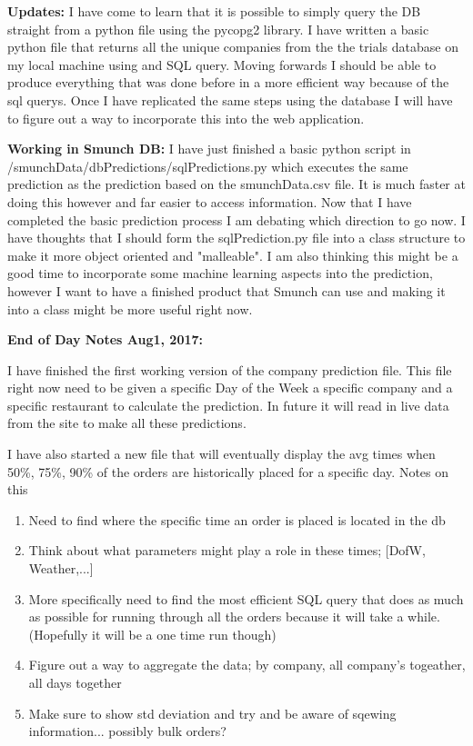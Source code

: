 \documentclass[12pt]{article}
\begin{document}
\textbf{Updates:} I have come to learn that it is possible to simply query the DB straight from a python file using the pycopg2 library. I have written a basic python file that returns all the unique companies from the the trials database on my local machine using and SQL query. Moving forwards I should be able to produce everything that was done before in a more efficient way because of the sql querys. Once I have replicated the same steps using the database I will have to figure out a way to incorporate this into the web application.

\textbf{Working in Smunch DB:} I have just finished a basic python script in /smunchData/dbPredictions/sqlPredictions.py which executes the same prediction as the prediction based on the smunchData.csv file. It is much faster at doing this however and far easier to access information. Now that I have completed the basic prediction process I am debating which direction to go now. I have thoughts that I should form the sqlPrediction.py file into a class structure to make it more object oriented and "malleable". I am also thinking this might be a good time to incorporate some machine learning aspects into the prediction, however I want to have a finished product that Smunch can use and making it into a class might be more useful right now. 

\textbf{End of Day Notes Aug1, 2017:}


I have finished the first working version of the company prediction file. This file right now need to be given a specific Day of the Week a specific company and a specific restaurant to calculate the prediction. In future it will read in live data from the site to make all these predictions.

I have also started a new file that will eventually display the avg times when 50\%, 75\%, 90\% of the orders are historically placed for a specific day. Notes on this

\begin{enumerate}
\item Need to find where the specific time an order is placed is located in the db
\item Think about what parameters might play a role in these times; [DofW, Weather,...]
\item More specifically need to find the most efficient SQL query that does as much as possible for running through all the orders because it will take a while. (Hopefully it will be a one time run though)
\item Figure out a way to aggregate the data; by company, all company's togeather, all days together
\item Make sure to show std deviation and try and be aware of sqewing information... possibly bulk orders?
\end{enumerate}
\end{document}
